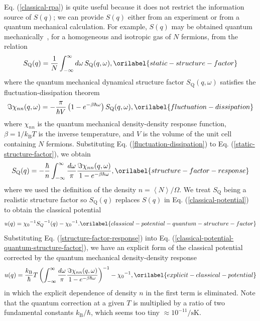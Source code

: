 \documentclass[aps,showkeys,noshowpacs,superscriptaddress,pre,preprint]{revtex4-2}
\let\label\orilabel
\begin{document}
Eq. (\ref{classical-rpa}) is quite useful because it does not restrict the information source of ${S(q)}$; 
we can provide ${S(q)}$ either from an experiment or from a quantum mechanical calculation.
For example, ${S(q)}$ may be obtained quantum mechanically~\cite{Giuliani-Vignale2005}, 
for a homogeneous and isotropic gas of $N$ fermions, from the relation
\begin{equation}
{S_\mathrm{Q} (q)} = \frac{1}{N} \int_{- \infty}^{\infty} {d\omega}\, {S_\mathrm{Q} (q, \omega)},
\label{static-structure-factor}
\end{equation}
where the quantum mechanical dynamical structure factor ${S_\mathrm{Q} ( q, \omega )}$ 
satisfies the fluctuation-dissipation theorem~\cite{Giuliani-Vignale2005}
\begin{equation}
\Im {\chi_{nn} ( q, \omega )} = - \frac{\pi}{\hbar V} \left( 1 - e^{-\beta \hbar \omega} \right) {S_\mathrm{Q}( q, \omega )} ,
\label{fluctuation-dissipation}
\end{equation}
where $\chi_{nn}$ is the quantum mechanical density-density response function, $\beta= 1/k_\mathrm{B}T$ is the inverse temperature,
and $V$ is the volume of the unit cell containing $N$ fermions.
Substituting Eq. (\ref{fluctuation-dissipation}) to Eq. (\ref{static-structure-factor}), we obtain
\begin{equation}
{S_\mathrm{Q} (q)} = - \frac{\hbar}{n} \int_{- \infty}^\infty \frac{d\omega}{\pi} 
\frac{\Im \chi_{nn} ( q, \omega )}{1 - e^{-\beta\hbar\omega}} ,
\label{structure-factor-response}
\end{equation}
where we used the definition of the density $n={\left\langle N \right\rangle}/\Omega$.
We treat $S_\mathrm{Q}$ being a realistic structure factor 
so $S_\mathrm{Q} (q)$ replaces $S (q)$ in Eq. (\ref{classical-potential}) to obtain the classical potential
\begin{equation}
u(q) =  {\chi_0}^{-1}  {{S_Q}^{-1} (q)} - {\chi_0}^{-1}  .
\label{classical-potential-quantum-structure-factor}
\end{equation}
Substituting Eq. (\ref{structure-factor-response}) into Eq. (\ref{classical-potential-quantum-structure-factor}),
we have an explicit form of the classical potential corrected by the quantum mechanical density-density response
\begin{equation}
u(q) = \frac{k_\mathrm{B}}{\hbar}  T 
\left( \int_{-\infty}^\infty \frac{d\omega}{\pi} \frac{\Im \chi_{nn} ( q, \omega )}{1 - e^{-\beta\hbar\omega}} \right)^{-1}
- {\chi_0}^{-1} ,
\label{explicit-classical-potential}
\end{equation}
in which the explicit dependence of density $n$ in the first term is eliminated.
Note that the quantum correction at a given $T$ is multiplied by a ratio of two fundamental constants $k_\mathrm{B} / \hbar$, 
which seems too tiny $\approx 10^{-11} / \mathrm{sK}$.
\end{document}
